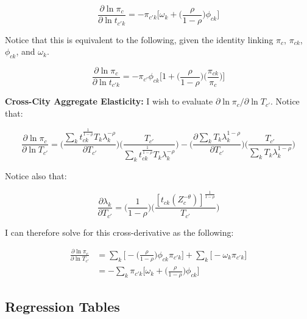 \documentclass[10pt]{article}
\begin{document}
\begin{equation*}
    \frac{\partial\ln{\pi_{c}}}{\partial\ln{t_{{c'}k}}} = -{\pi_{{c'}k}}\Big[\omega_{k}+\Big(\frac{\rho}{1-\rho}\Big)\phi_{ck}]
\end{equation*}

Notice that this is equivalent to the following, given the identity linking $\pi_{c}$, $\pi_{ck}$, $\phi_{ck}$, and $\omega_{k}$.

\begin{equation}
    \frac{\partial\ln{\pi_{c}}}{\partial\ln{t_{{c'}k}}} = -{\pi_{c'}}{\phi_{ck}}\Big[1+\Big(\frac{\rho}{1-\rho}\Big)\Big(\frac{\pi_{ck}}{\pi_{c}}\Big)\Big]
\end{equation}

\noindent\textbf{Cross-City Aggregate Elasticity:} I wish to evaluate $\partial\ln{\pi_{c}}/\partial\ln{T_{c'}}$. Notice that:

\begin{equation*}
    \frac{\partial\ln{\pi_{c}}}{\partial\ln{T_{c'}}} = \Bigg(\frac{\sum\limits_{k}{{t^{\frac{1}{1-\rho}}_{ck}}}{T_{k}}{\lambda^{-\rho}_{k}}}{\partial{T_{c'}}}\Bigg)\Bigg(\frac{T_{c'}}{\sum\limits_{k}t^{\frac{1}{1-\rho}}_{ck}{T_{k}}{\lambda^{-\rho}_{k}}}\Bigg) - \Bigg(\frac{\partial\sum\limits_{k}{T_{k}}\lambda^{1-\rho}_{k}}{\partial{T_{c'}}}\Bigg)\Bigg(\frac{T_{c'}}{\sum\limits_{k}{T_{k}}{\lambda_{k}^{1-\rho}}}\Bigg)
\end{equation*}

Notice also that:

\begin{equation*}
    \frac{\partial\lambda_{k}}{\partial{T_{c'}}} = \Bigg(\frac{1}{1-\rho}\Bigg)\Bigg(\frac{[t_{ck}(Z_{c}^{-\theta})]^{\frac{1}{1-\rho}}}{T_{c'}}\Bigg)
\end{equation*}

I can therefore solve for this cross-derivative as the following:

\begin{align*}
    \frac{\partial\ln{\pi_{c}}}{\partial\ln{T_{c'}}} & = \sum\limits_{k}\Big[-\Big(\frac{\rho}{1-\rho}\Big)\phi_{ck}{\pi_{{c'}k}}\Big]+\sum\limits_{k}\Big[-\omega_{k}\pi_{{c'}k}\Big] \\ &= -\sum\limits_{k}{\pi_{{c'}k}}\Big[\omega_{k}+\Big(\frac{\rho}{1-\rho}\Big)\phi_{ck}\Big]
\end{align*}

\subsection{Regression Tables}
\end{document}
